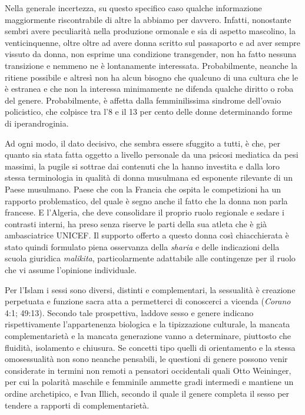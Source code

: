 \documentclass[
  letterpaper,
  DIV=11,
  numbers=noendperiod]{scrartcl}
\begin{document}
Nella generale incertezza, su questo specifico caso qualche informazione
maggiormente riscontrabile di altre la abbiamo per davvero. Infatti,
nonostante sembri avere peculiarità nella produzione ormonale e sia di
aspetto mascolino, la venticinquenne, oltre oltre ad avere donna scritto
sul passaporto e ad aver sempre vissuto da donna, non esprime una
condizione transgender, non ha fatto nessuna transizione e nemmeno ne è
lontanamente interessata. Probabilmente, neanche la ritiene possibile e
altresì non ha alcun bisogno che qualcuno di una cultura che le è
estranea e che non la interessa minimamente ne difenda qualche diritto o
roba del genere. Probabilmente, è affetta dalla femminilissima sindrome
dell'ovaio policistico, che colpisce tra l'8 e il 13 per cento delle
donne determinando forme di iperandroginia.

Ad ogni modo, il dato decisivo, che sembra essere sfuggito a tutti, è
che, per quanto sia stata fatta oggetto a livello personale da una
psicosi mediatica da pesi massimi, la pugile si sottrae dai contenuti
che la hanno investita e dalla loro stessa terminologia in qualità di
donna musulmana ed esponente rilevante di un Paese musulmano. Paese che
con la Francia che ospita le competizioni ha un rapporto problematico,
del quale è segno anche il fatto che la donna non parla francese. E
l'Algeria, che deve consolidare il proprio ruolo regionale e sedare i
contrasti interni, ha preso senza riserve le parti della sua atleta che
è già ambasciatrice UNICEF. Il supporto offerto a questo donna così
chiacchierata è stato quindi formulato piena osservanza della
\emph{sharia} e delle indicazioni della scuola giuridica
\emph{malikita}, particolarmente adattabile alle contingenze per il
ruolo che vi assume l'opinione individuale.

Per l'Islam i sessi sono diversi, distinti e complementari, la
sessualità è creazione perpetuata e funzione sacra atta a permetterci di
conoscerci a vicenda (\emph{Corano} 4:1; 49:13). Secondo tale
prospettiva, laddove sesso e genere indicano rispettivamente
l'appartenenza biologica e la tipizzazione culturale, la mancata
complementarietà e la mancata generazione vanno a determinare, piuttosto
che fluidità, isolamento e chiusura. Se concetti tipo quelli di
orientamento e la stessa omosessualità non sono neanche pensabili, le
questioni di genere possono venir considerate in termini non remoti a
pensatori occidentali quali Otto Weininger, per cui la polarità maschile
e femminile ammette gradi intermedi e mantiene un ordine archetipico, e
Ivan Illich, secondo il quale il genere completa il sesso per tendere a
rapporti di complementarietà.
\end{document}
